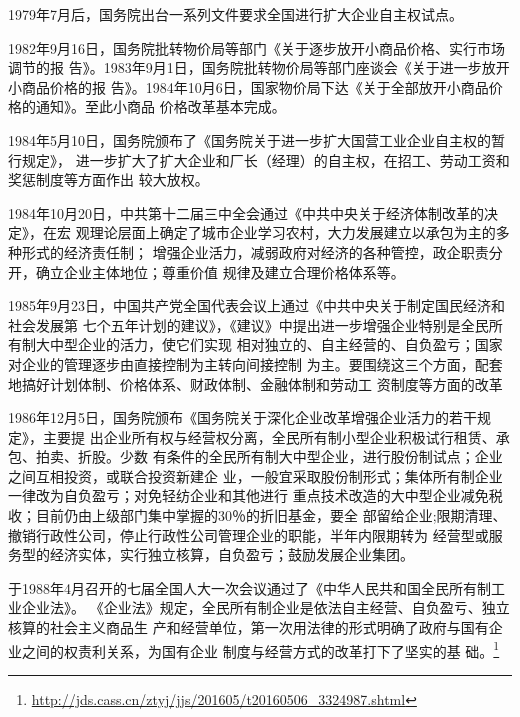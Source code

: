 1979年7月后，国务院出台一系列文件要求全国进行扩大企业自主权试点。

1982年9月16日，国务院批转物价局等部门《关于逐步放开小商品价格、实行市场调节的报
告》。1983年9月1日，国务院批转物价局等部门座谈会《关于进一步放开小商品价格的报
告》。1984年10月6日，国家物价局下达《关于全部放开小商品价格的通知》。至此小商品
价格改革基本完成。


1984年5月10日，国务院颁布了《国务院关于进一步扩大国营工业企业自主权的暂行规定》，
进一步扩大了扩大企业和厂长（经理）的自主权，在招工、劳动工资和奖惩制度等方面作出
较大放权。

1984年10月20日，中共第十二届三中全会通过《中共中央关于经济体制改革的决定》，在宏
观理论层面上确定了城市企业学习农村，大力发展建立以承包为主的多种形式的经济责任制；
增强企业活力，减弱政府对经济的各种管控，政企职责分开，确立企业主体地位；尊重价值
规律及建立合理价格体系等。

1985年9月23日，中国共产党全国代表会议上通过《中共中央关于制定国民经济和社会发展第
七个五年计划的建议》，《建议》中提出进一步增强企业特别是全民所有制大中型企业的活力，使它们实现
相对独立的、自主经营的、自负盈亏；国家对企业的管理逐步由直接控制为主转向间接控制
为主。要围绕这三个方面，配套地搞好计划体制、价格体系、财政体制、金融体制和劳动工
资制度等方面的改革

1986年12月5日，国务院颁布《国务院关于深化企业改革增强企业活力的若干规定》，主要提
出企业所有权与经营权分离，全民所有制小型企业积极试行租赁、承包、拍卖、折股。少数
有条件的全民所有制大中型企业，进行股份制试点；企业之间互相投资，或联合投资新建企
业，一般宜采取股份制形式；集体所有制企业一律改为自负盈亏；对免轻纺企业和其他进行
重点技术改造的大中型企业减免税收；目前仍由上级部门集中掌握的30％的折旧基金，要全
部留给企业;限期清理、撤销行政性公司，停止行政性公司管理企业的职能，半年内限期转为
经营型或服务型的经济实体，实行独立核算，自负盈亏；鼓励发展企业集团。

于1988年4月召开的七届全国人大一次会议通过了《中华人民共和国全民所有制工业企业法》。
《企业法》规定，全民所有制企业是依法自主经营、自负盈亏、独立核算的社会主义商品生
产和经营单位，第一次用法律的形式明确了政府与国有企业之间的权责利关系，为国有企业
制度与经营方式的改革打下了坚实的基
础。\footnote{\url{http://jds.cass.cn/ztyj/jjs/201605/t20160506_3324987.shtml}}


